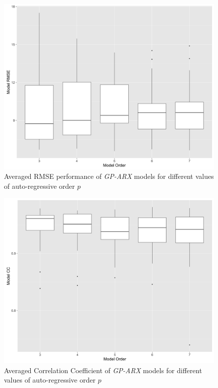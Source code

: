 \documentclass[referee,a4paper,12pt,traditabstract]{swsc}
\begin{document}
\begin{linenumbers}
\begin{figure}
   \centering
   \includegraphics[width=\textwidth]{Model_RMSE_validationStorms}
      \caption{Averaged RMSE performance of \emph{GP-ARX} models for different values of auto-regressive order $p$}
         \label{fig:prmse}
 \end{figure}


\begin{figure}
   \centering
   \includegraphics[width=\textwidth]{Model_corr_validationStorms}
      \caption{Averaged Correlation Coefficient of \emph{GP-ARX} models for different values of auto-regressive order $p$}
         \label{fig:pcorr}
 \end{figure}


\end{linenumbers}
\end{document}

